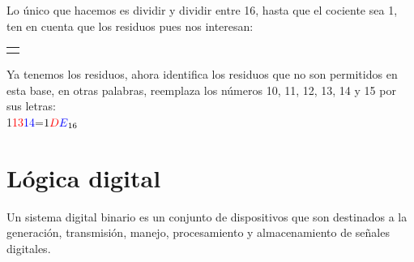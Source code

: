 \documentclass[
	12pt, %
	fleqn, %
	a4paper, %
]{LegrandOrangeBook}
\begin{document}
\def\basetenconversiontable#1#2{%
    \begin{tikzpicture}[every node/.style={minimum width=1cm, minimum height=0.5cm}, x=1cm,y=0.5cm]
    \total=#1%
    \targetbase=#2
    \def\newnumber{}
    \pgfmathloop
    \ifnum\total<1
    \else
        \ifnum\pgfmathcounter>1
            \node at (\pgfmathcounter, -\pgfmathcounter+1) (tmp) {\the\targetbase};
            \draw (tmp.north west) |- (tmp.south east);
            \node at (\pgfmathcounter-1, -\pgfmathcounter) (tmp) {\pgfmathparse{int(\total*\targetbase)}\pgfmathresult};
            \draw (tmp.south west) -- (tmp.south east);
            \pgfmathparse{int(\lasttotal-\total*\targetbase)}%
            \let\digit=\pgfmathresult
            \node at (\pgfmathcounter-1, -\pgfmathcounter-1) [text=red] {\digit};
            \edef\newnumber{\digit\newnumber}
        \fi
        \ifnum\total<\targetbase
                \edef\newnumber{\the\total\newnumber}
            \node at (\pgfmathcounter, -\pgfmathcounter) [text=red]  {\the\total};
        \else
            \node at (\pgfmathcounter, -\pgfmathcounter) {\the\total};
        \fi
        \lasttotal=\total
        \divide\total by\targetbase
    \repeatpgfmathloop    
    \draw [->] (\pgfmathcounter-1,-\pgfmathcounter-1) -- ++(-0.5,0); 
    \node [anchor=west] at (1, -\pgfmathcounter-2) {$#1=\newnumber_{\the\targetbase}$};
    \end{tikzpicture}   
}
\begin{example}
Lo único que hacemos es dividir y dividir entre 16, hasta que el cociente sea 1, ten en cuenta que los residuos pues nos interesan:
\begin{center}
\begin{tabular}{c}
\basetenconversiontable{478}{16}
\end{tabular}
\end{center}
Ya tenemos los residuos, ahora identifica los residuos que no son permitidos en esta base, en otras palabras, reemplaza los números 10, 11, 12, 13, 14 y 15 por sus letras:\\
1\textcolor{red}{13}\textcolor{blue}{14}=$1\textcolor{red}{D}\textcolor{blue}{E}_{16}$
\end{example}
\chapter{Lógica digital}
Un sistema digital binario es un conjunto de dispositivos que son destinados a la generación, transmisión, manejo, procesamiento y almacenamiento de señales digitales.
\end{document}
